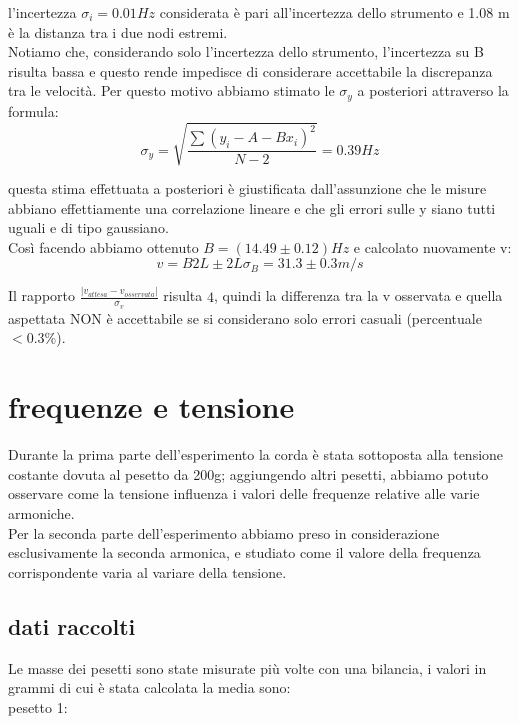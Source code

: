 \documentclass[a4paper]{article}
\theoremstyle{definition}
\begin{document}
l'incertezza \(\sigma_{i}= 0.01 Hz\) considerata è pari all'incertezza dello strumento e 1.08 m è la distanza tra i due nodi estremi.\\
Notiamo che, considerando solo l'incertezza dello strumento, l'incertezza su B risulta bassa e questo rende impedisce di considerare accettabile la discrepanza tra le velocità. Per questo motivo abbiamo stimato le \(\sigma_{y}\) a posteriori attraverso la formula:
\[\sigma_{y} = \sqrt{\frac{\sum (y_{i}-A-Bx_{i})^{2}}{N-2}} = 0.39 Hz\]

\noindent questa stima effettuata a posteriori è giustificata dall'assunzione che le misure abbiano effettiamente una correlazione lineare e che gli errori sulle y siano tutti uguali e di tipo gaussiano.\\
Così facendo abbiamo ottenuto \(B = (14.49 \pm 0.12) Hz\) e calcolato nuovamente v:
\[v = B2L \pm 2L \sigma_{B} =  31.3\pm 0.3 m/s\]

\noindent Il rapporto \(\frac{\left |v_{attesa}-v_{osservata}\right |}{\sigma_{v}}\) risulta \(4\), quindi  la differenza tra la v osservata e quella aspettata NON è accettabile se si considerano solo errori casuali (percentuale \(<0.3 \%\)).\\

	
	\section{frequenze e tensione}
	Durante la prima parte dell'esperimento la corda è stata sottoposta alla tensione costante dovuta al pesetto da 200g; aggiungendo altri pesetti, abbiamo potuto osservare come la tensione influenza i valori delle frequenze relative alle varie armoniche.\\
	Per la seconda parte dell'esperimento abbiamo preso in considerazione esclusivamente la seconda armonica, e studiato come il valore della frequenza corrispondente varia al variare della tensione.
	
	\subsection{dati raccolti}
	
	\noindent Le masse dei pesetti sono state misurate più volte con una bilancia, i valori in grammi di cui è stata calcolata la media sono:\\
	
	pesetto 1:
	\begin{figure}[!ht]
	\end{figure}
	
\end{document}
